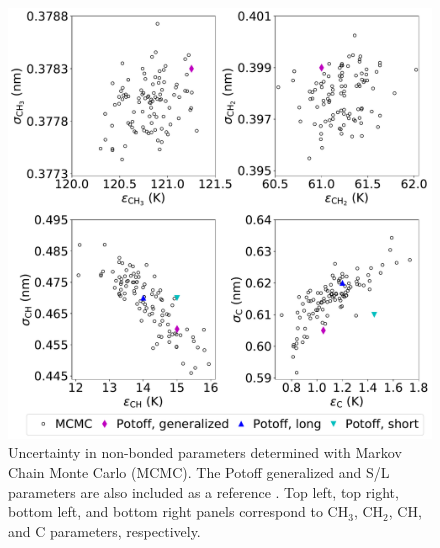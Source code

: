 \documentclass[preprint,review,12pt]{elsarticle}
\begin{document}
    \begin{figure}[htb!]
    	\centering
    	\includegraphics[width=6.4in]{MCMC_nonbonded.pdf}
    	\caption{Uncertainty in non-bonded parameters determined with Markov Chain Monte Carlo (MCMC). The Potoff generalized and S/L parameters are also included as a reference \cite{Mie,Potoff_branched}. Top left, top right, bottom left, and bottom right panels correspond to CH$_3$, CH$_2$, CH, and C parameters, respectively.}		
    	\label{fig:nonbonded_uncertainty}
    \end{figure}
    
	
\end{document}
